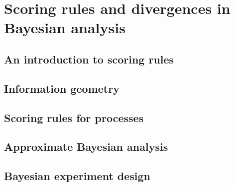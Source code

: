 \part{Scoring rules and divergences in Bayesian analysis}

\chapter{An introduction to scoring rules}



\chapter{Information geometry}



\chapter{Scoring rules for processes}



\chapter{Approximate Bayesian analysis}



\chapter{Bayesian experiment design}


 